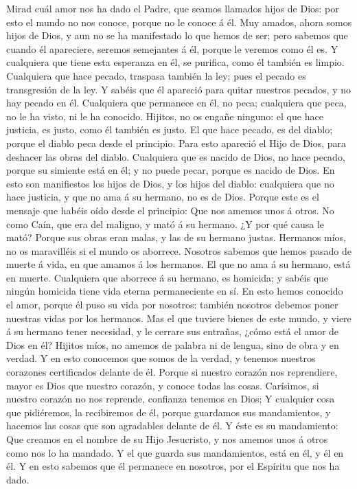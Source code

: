  Mirad cuál amor nos ha dado el Padre, que seamos llamados
hijos de Dios: por esto el mundo no nos conoce, porque no le conoce á
él.  Muy amados, ahora somos hijos de Dios, y aun no se ha
manifestado lo que hemos de ser; pero sabemos que cuando él apareciere,
seremos semejantes á él, porque le veremos como él es.  Y
cualquiera que tiene esta esperanza en él, se purifica, como él también
es limpio.  Cualquiera que hace pecado, traspasa también la
ley; pues el pecado es transgresión de la ley.  Y sabéis que
él apareció para quitar nuestros pecados, y no hay pecado en él.
 Cualquiera que permanece en él, no peca; cualquiera que
peca, no le ha visto, ni le ha conocido.  Hijitos, no os
engañe ninguno: el que hace justicia, es justo, como él también es
justo.  El que hace pecado, es del diablo; porque el diablo
peca desde el principio. Para esto apareció el Hijo de Dios, para
deshacer las obras del diablo.  Cualquiera que es nacido de
Dios, no hace pecado, porque su simiente está en él; y no puede pecar,
porque es nacido de Dios.  En esto son manifiestos los
hijos de Dios, y los hijos del diablo: cualquiera que no hace justicia,
y que no ama á su hermano, no es de Dios.  Porque este es
el mensaje que habéis oído desde el principio: Que nos amemos unos á
otros.  No como Caín, que era del maligno, y mató á su
hermano. ¿Y por qué causa le mató? Porque sus obras eran malas, y las de
su hermano justas.  Hermanos míos, no os maravilléis si el
mundo os aborrece.  Nosotros sabemos que hemos pasado de
muerte á vida, en que amamos á los hermanos. El que no ama á su hermano,
está en muerte.  Cualquiera que aborrece á su hermano, es
homicida; y sabéis que ningún homicida tiene vida eterna permaneciente
en sí.  En esto hemos conocido el amor, porque él puso su
vida por nosotros: también nosotros debemos poner nuestras vidas por los
hermanos.  Mas el que tuviere bienes de este mundo, y viere
á su hermano tener necesidad, y le cerrare sus entrañas, ¿cómo está el
amor de Dios en él?  Hijitos míos, no amemos de palabra ni
de lengua, sino de obra y en verdad.  Y en esto conocemos
que somos de la verdad, y tenemos nuestros corazones certificados
delante de él.  Porque si nuestro corazón nos reprendiere,
mayor es Dios que nuestro corazón, y conoce todas las cosas.
 Carísimos, si nuestro corazón no nos reprende, confianza
tenemos en Dios;  Y cualquier cosa que pidiéremos, la
recibiremos de él, porque guardamos sus mandamientos, y hacemos las
cosas que son agradables delante de él.  Y éste es su
mandamiento: Que creamos en el nombre de su Hijo Jesucristo, y nos
amemos unos á otros como nos lo ha mandado.  Y el que
guarda sus mandamientos, está en él, y él en él. Y en esto sabemos que
él permanece en nosotros, por el Espíritu que nos ha dado.

